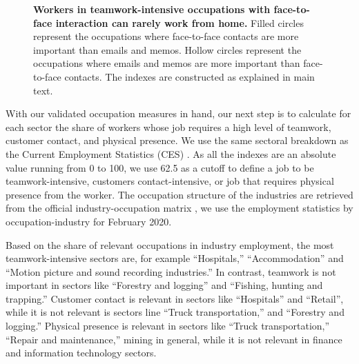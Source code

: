 \begin{figure}[!h]

\caption{{\bf Workers in teamwork-intensive occupations with face-to-face interaction can rarely work from home.}
Filled circles represent the occupations where face-to-face contacts are more important than emails and memos. Hollow circles represent the occupations where emails and memos are more important than face-to-face contacts. The indexes are constructed as explained in main text. }
\label{teamwork_validation}
\end{figure}

With our validated occupation measures in hand, our next step is to calculate for each sector the share of workers whose job requires a high level of teamwork, customer contact, and physical presence. 
We use the same sectoral breakdown as the Current Employment Statistics (CES) \cite{CES}. As all the indexes are an absolute value running from 0 to 100, we use 62.5 as a cutoff to define a job to be teamwork-intensive, customers contact-intensive, or job that requires physical presence from the worker.  The occupation structure of the industries are retrieved from the official industry-occupation matrix \cite{employment-matrix}, we use the employment statistics by occupation-industry for February 2020. 

Based on the share of relevant occupations in industry employment, the most teamwork-intensive sectors are, for example ``Hospitals,'' ``Accommodation'' and  ``Motion picture and sound recording industries.'' In contrast, teamwork is not important in sectors like ``Forestry and logging'' and ``Fishing, hunting and trapping.''  Customer contact is relevant in sectors like ``Hospitals''  and ``Retail'', while it is not relevant is sectors line ``Truck transportation,'' and ``Forestry and logging.'' Physical presence is relevant in sectors like  ``Truck transportation,'' ``Repair and maintenance,'' mining in general, while it is not relevant in finance and information technology sectors. 

